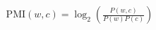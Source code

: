 \documentclass[preview]{standalone}
\begin{document}
\begin{align*}
\mathrm{PMI}(w,c)=\log_{2}\!\left(\frac{P(w,c)}{P(w)P(c)}\right)
\end{align*}
\end{document}
